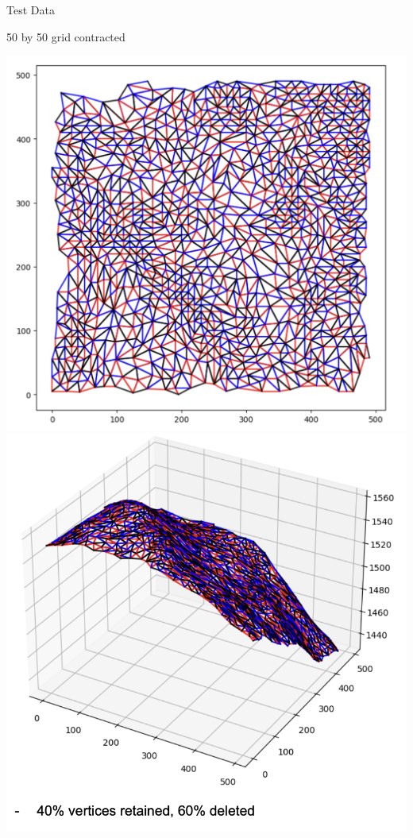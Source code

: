\begin{frame}{Test Data}
\begin{center}
    
        50 by 50 grid contracted
        
    \end{center}
    \begin{center}
        \includegraphics[scale=.36]{images/50by50contracted2d.png}
        \includegraphics[scale=.4]{images/50by50contracted.png}
        
        
    \end{center}

\end{frame}

